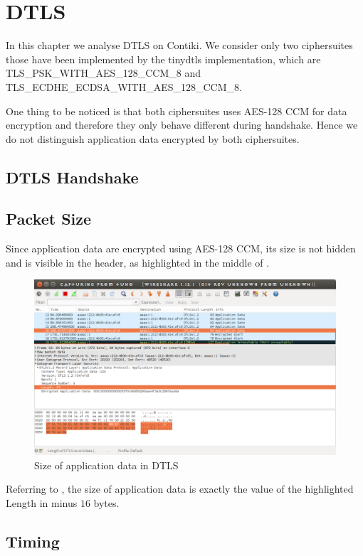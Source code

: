 \chapter{DTLS} \label{Chp: DTLS}

In this chapter we analyse DTLS on Contiki. We consider only two ciphersuites those have been implemented by the tinydtls implementation, which are TLS\_PSK\_WITH\_AES\_128\_CCM\_8 and TLS\_ECDHE\_ECDSA\_WITH\_AES\_128\_CCM\_8. 

One thing to be noticed is that both ciphersuites uses AES-128 CCM for data encryption and therefore they only behave different during handshake. Hence we do not distinguish application data encrypted by both ciphersuites.

\section{DTLS Handshake}

\section{Packet Size}

Since application data are encrypted using AES-128 CCM, its size is not hidden and is visible in the header, as highlighted in the middle of .

\begin{figure}[ht!]
	\center
	\includegraphics[width=.7\textwidth]{fig/dtlslength.png}
	\caption{Size of application data in DTLS}
	\label{Fig: Size of application data in DTLS}
\end{figure}

Referring to \cite{rfc5116}, the size of application data is exactly the value of the highlighted Length in  minus $16$ bytes.


\section{Timing}

